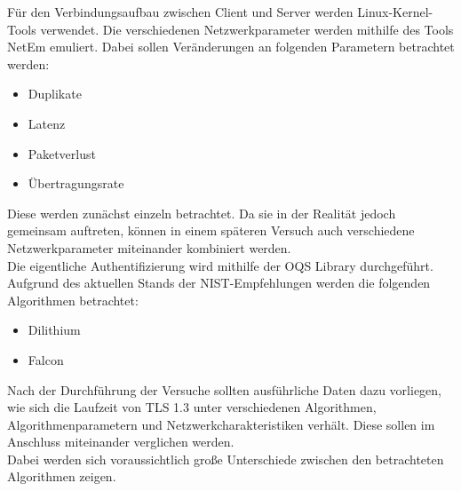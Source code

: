 	Für den Verbindungsaufbau zwischen Client und Server werden Linux-Kernel-Tools verwendet. Die verschiedenen Netzwerkparameter werden mithilfe des Tools NetEm emuliert. Dabei sollen Veränderungen an folgenden Parametern betrachtet werden:

	\begin{itemize}
		\item Duplikate	
		\item Latenz
		\item Paketverlust
		\item Übertragungsrate
	\end{itemize}

	Diese werden zunächst einzeln betrachtet. Da sie in der Realität jedoch gemeinsam auftreten, können in einem späteren Versuch auch verschiedene Netzwerkparameter miteinander kombiniert werden.\\
	
	Die eigentliche Authentifizierung wird mithilfe der \ac{OQS} Library \cite{Stebila2017} durchgeführt. Aufgrund des aktuellen Stands der NIST-Empfehlungen werden die folgenden Algorithmen betrachtet:
	
	\begin{itemize}
		\item Dilithium
		\item Falcon
	\end{itemize}

	Nach der Durchführung der Versuche sollten ausführliche Daten dazu vorliegen, wie sich die Laufzeit von TLS 1.3 unter verschiedenen Algorithmen, Algorithmenparametern und Netzwerkcharakteristiken verhält. Diese sollen im Anschluss miteinander verglichen werden.\\
	
	Dabei werden sich voraussichtlich große Unterschiede zwischen den betrachteten Algorithmen zeigen.
